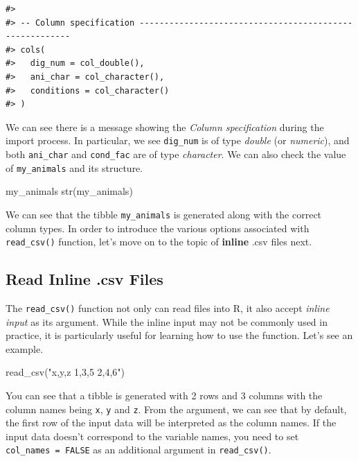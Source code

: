 \documentclass[
]{book}
\newenvironment{Shaded}{\begin{snugshade}}{\end{snugshade}}
\newcommand{\FunctionTok}[1]{\textcolor[rgb]{0.00,0.00,0.00}{#1}}
\newcommand{\NormalTok}[1]{#1}
\newcommand{\StringTok}[1]{\textcolor[rgb]{0.31,0.60,0.02}{#1}}
\begin{document}
\begin{verbatim}
#> 
#> -- Column specification --------------------------------------------------------
#> cols(
#>   dig_num = col_double(),
#>   ani_char = col_character(),
#>   conditions = col_character()
#> )
\end{verbatim}

We can see there is a message showing the \emph{Column specification} during the import process. In particular, we see \texttt{dig\_num} is of type \emph{double} (or \emph{numeric}), and both \texttt{ani\_char} and \texttt{cond\_fac} are of type \emph{character}. We can also check the value of \texttt{my\_animals} and its structure.

\begin{Shaded}
\begin{Highlighting}[]
\NormalTok{my\_animals}
\FunctionTok{str}\NormalTok{(my\_animals)}
\end{Highlighting}
\end{Shaded}

We can see that the tibble \texttt{my\_animals} is generated along with the correct column types. In order to introduce the various options associated with \texttt{read\_csv()} function, let's move on to the topic of \textbf{inline} .csv files next.

\hypertarget{read-inline-.csv-files}{%
\subsection{Read Inline .csv Files}\label{read-inline-.csv-files}}

The \texttt{read\_csv()} function not only can read files into R, it also accept \emph{inline input} as its argument. While the inline input may not be commonly used in practice, it is particularly useful for learning how to use the function. Let's see an example.

\begin{Shaded}
\begin{Highlighting}[]
\FunctionTok{read\_csv}\NormalTok{(}\StringTok{"x,y,z}
\StringTok{          1,3,5}
\StringTok{          2,4,6"}\NormalTok{)}
\end{Highlighting}
\end{Shaded}

You can see that a tibble is generated with 2 rows and 3 columns with the column names being \texttt{x}, \texttt{y} and \texttt{z}. From the argument, we can see that by default, the first row of the input data will be interpreted as the column names. If the input data doesn't correspond to the variable names, you need to set \texttt{col\_names\ =\ FALSE} as an additional argument in \texttt{read\_csv()}.
\end{document}
